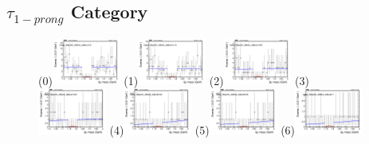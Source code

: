 \newpage

\subsection{$\tau_{1-prong}$ Category}
\label{sec:tauha}

\begin{figure}[h!]
        \centering
        \subfigure(0){\includegraphics[width=0.2\textwidth]{power_law/plots/tauhA/massfit_tauhA_40bins_bdtcut-0.2.png}}
        \subfigure(1){\includegraphics[width=0.2\textwidth]{power_law/plots/tauhA/massfit_tauhA_40bins_bdtcut-0.14.png}}
        \subfigure(2){\includegraphics[width=0.2\textwidth]{power_law/plots/tauhA/massfit_tauhA_40bins_bdtcut-0.08.png}}
        \subfigure(3){\includegraphics[width=0.2\textwidth]{power_law/plots/tauhA/massfit_tauhA_40bins_bdtcut-0.02.png}}
        \subfigure(4){\includegraphics[width=0.2\textwidth]{power_law/plots/tauhA/massfit_tauhA_40bins_bdtcut0.04.png}}
        \subfigure(5){\includegraphics[width=0.2\textwidth]{power_law/plots/tauhA/massfit_tauhA_40bins_bdtcut0.06.png}}
        \subfigure(6){\includegraphics[width=0.2\textwidth]{power_law/plots/tauhA/massfit_tauhA_40bins_bdtcut0.1.png}}

\end{figure}
